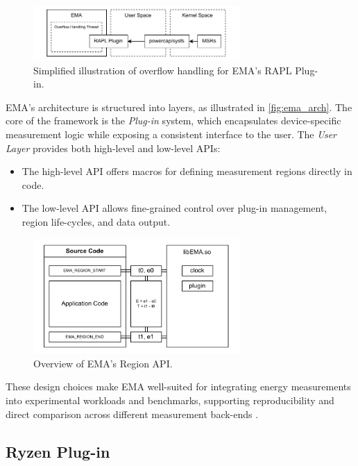 \begin{figure}[htbp]
    \centering
    \includegraphics[width=0.7\textwidth]{assets/ema_rapl_overflow}
    \caption{Simplified illustration of overflow handling for \gls{EMA}'s \gls{RAPL} Plug-in.}
    \label{fig:ema_rapl_overflow}
\end{figure}

\gls{EMA}'s architecture is structured into layers, as illustrated in
\cref{fig:ema_arch}. The core of the framework is the \emph{Plug-in} system,
which encapsulates device-specific measurement logic while exposing a
consistent interface to the user. The \emph{User Layer} provides both
high-level and low-level \gls{API}s:
\begin{itemize}
    \item The high-level \gls{API} offers macros for defining measurement
        regions directly in code. 
    \item The low-level \gls{API} allows fine-grained control over plug-in
        management, region life-cycles, and data output.
\end{itemize}
\parencite{NAAICE}

\begin{figure}[htbp]
    \centering
    \includegraphics[width=0.7\textwidth]{assets/ema_region}
    \caption{Overview of \gls{EMA}'s Region API.}
    \label{fig:ema_region}
\end{figure}

These design choices make \gls{EMA} well-suited for integrating energy
measurements into experimental workloads and benchmarks, supporting
reproducibility and direct comparison across different measurement back-ends
\parencite{NAAICE}.

\subsection{Ryzen Plug-in}

